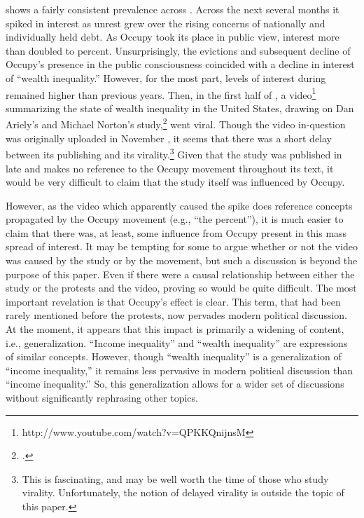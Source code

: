 \documentclass[openany,twoside]{memoir}
\begin{document}
\begin{Spacing}{2}
 shows a fairly consistent prevalence across .
Across the next several months it spiked in interest as unrest grew over the rising concerns of nationally and individually held debt.
As Occupy took its place in public view, interest more than doubled to  percent.
Unsurprisingly, the evictions and subsequent decline of Occupy's presence in the public consciousness coincided with a decline in interest of ``wealth inequality.''
However, for the most part, levels of interest during  remained higher than previous years.
Then, in the first half of , a video\footnote{
http://www.youtube.com/watch?v=QPKKQnijnsM}
summarizing the state of wealth inequality in the United States, drawing on Dan Ariely's and Michael Norton's  study,\footcite{arielynorton11} went viral.
Though the video in-question was originally uploaded in November , it seems that there was a short delay between its publishing and its virality.\footnote{
This is fascinating, and may be well worth the time of those who study virality.
Unfortunately, the notion of delayed virality is outside the topic of this paper.}
Given that the study was published in late  and makes no reference to the Occupy movement throughout its text, it would be very difficult to claim that the study itself was influenced by Occupy.

However, as the video which apparently caused the  spike does reference concepts propagated by the Occupy movement (e.g., ``the  percent''), it is much easier to claim that there was, at least, some influence from Occupy present in this mass spread of interest.
It may be tempting for some to argue whether or not the video was caused by the study or by the movement, but such a discussion is beyond the purpose of this paper.
Even if there were a causal relationship between either the study or the protests and the video, proving so would be quite difficult.
The most important revelation is that Occupy's effect is clear.
This term, that had been rarely mentioned before the protests, now pervades modern political discussion.
At the moment, it appears that this impact is primarily a widening of content, i.e., generalization.
``Income inequality'' and ``wealth inequality'' are expressions of similar concepts.
However, though ``wealth inequality'' is a generalization of ``income inequality,'' it remains less pervasive in modern political discussion than ``income inequality.''
So, this generalization allows for a wider set of discussions without significantly rephrasing other topics.


\end{Spacing}
\end{document}
